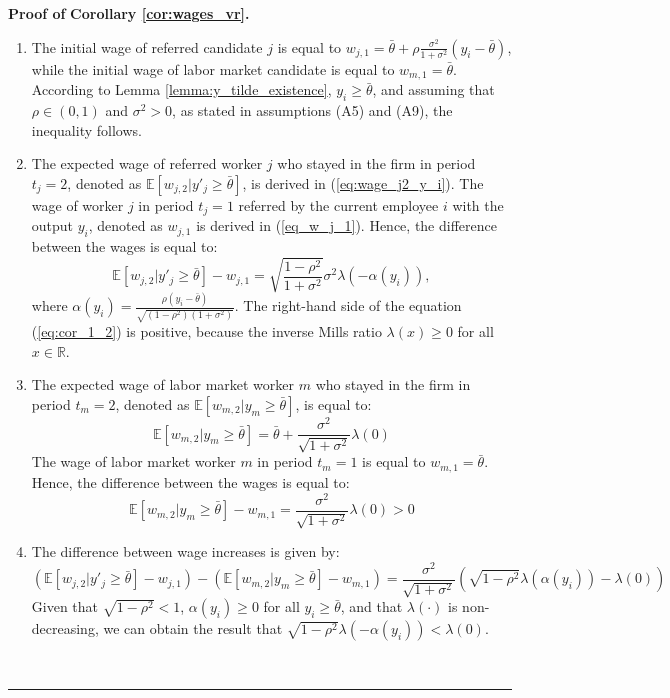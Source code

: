 \documentclass[12pt]{article}
\newenvironment{proof}[1][Proof of]{\noindent\textbf{#1} }{\ \rule{0.5em}{0.5em}}
\begin{document}
\begin{proof}
    \textbf{Corollary \ref{cor:wages_vr}.}
    \begin{enumerate}[label={\roman*})]
        \item The initial wage of referred candidate $j$ is equal to $w_{j,1} =\bar{\theta}+\rho\frac{\sigma^2}{1+\sigma^2}(y_i-\bar{\theta})$, while the initial wage of labor market candidate is equal to $w_{m,1} = \bar{\theta}$. According to Lemma \ref{lemma:y_tilde_existence}, $y_i \geq \bar{\theta}$, and assuming that $\rho \in (0,1)$ and $\sigma^2 >0$, as stated in assumptions (A5) and (A9), the inequality follows.
        \item The expected wage of referred worker $j$ who stayed in the firm in period $t_j = 2$, denoted as $\mathbb{E}[w_{j,2}|y'_j \geq \bar{\theta}]$, is derived in (\ref{eq:wage_j2_y_i}). The wage of worker $j$ in period $t_j = 1$ referred by the current employee $i$ with the output $y_i$, denoted as $w_{j,1}$ is derived in (\ref{eq_w_j_1}). Hence, the difference between the wages is equal to:
        \begin{equation}\label{eq:cor_1_2}
            \mathbb{E}[w_{j,2}|y'_j \geq \bar{\theta}] - w_{j,1} = 
            \sqrt{\frac{1-\rho^2}{1+\sigma^2}}\sigma^2\lambda(-\alpha(y_i)),
        \end{equation}
        where $\alpha (y_i) = \frac{\rho\left(y_i - \bar{\theta}\right)}{\sqrt{(1-\rho^2)(1+\sigma^2)}}$. The right-hand side of the equation (\ref{eq:cor_1_2}) is positive, because the inverse Mills ratio $\lambda(x)\geq 0$ for all $x \in \mathbb{R}$.
        \item The expected wage of labor market worker $m$ who stayed in the firm in period $t_m = 2$, denoted as $\mathbb{E}[w_{m,2}|y_m \geq \bar{\theta}]$, is equal to:
        \begin{equation*}
            \mathbb{E}[w_{m,2}|y_m \geq \bar{\theta}] = \bar{\theta} + \frac{\sigma^2 }{\sqrt{1+\sigma^2}}\lambda(0)
        \end{equation*}
        The wage of labor market worker $m$ in period $t_m =1$ is equal to $w_{m,1} = \bar{\theta}$. Hence, the difference between the wages is equal to:
        \begin{equation*}
            \mathbb{E}[w_{m,2}|y_m \geq \bar{\theta}] - w_{m,1}
            = \frac{\sigma^2 }{\sqrt{1+\sigma^2}}\lambda(0) >0
        \end{equation*}
        \item The difference between wage increases is given by: 
        \begin{equation*}
            \left( \mathbb{E}[w_{j,2}|y'_j \geq \bar{\theta}] - w_{j,1} \right) - 
            \left(\mathbb{E}[w_{m,2}|y_m \geq \bar{\theta}] - w_{m,1}\right) =
            \frac{\sigma^2 }{\sqrt{1+\sigma^2}}\left(\sqrt{1-\rho^2}\lambda(\alpha(y_i))- \lambda(0)\right)
        \end{equation*}
        Given that $\sqrt{1-\rho^2} < 1$, $\alpha(y_i) \geq 0$ for all $y_i \geq \bar{\theta}$, and that $\lambda(\cdot)$ is non-decreasing, we can obtain the result that $\sqrt{1-\rho^2}\lambda(-\alpha(y_i)) < \lambda(0)$.
    \end{enumerate}
\end{proof}
\end{document}
